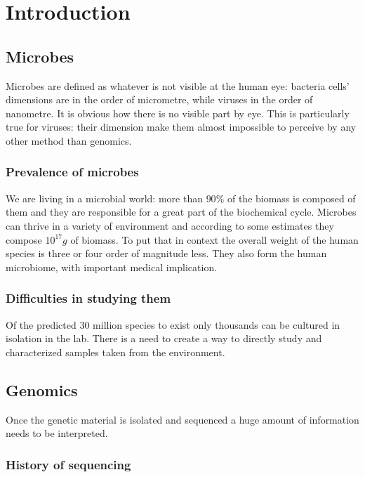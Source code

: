 \chapter{Introduction}

\section{Microbes}
Microbes are defined as whatever is not visible at the human eye: bacteria cells' dimensions are in the order of micrometre, while viruses in the order of nanometre.
It is obvious how there is no visible part by eye.
This is particularly true for viruses: their dimension make them almost impossible to perceive by any other method than genomics.

	\subsection{Prevalence of microbes}
	We are living in a microbial world: more than $90\%$ of the biomass is composed of them and they are responsible for a great part of the biochemical cycle.
	Microbes can thrive in a variety of environment and according to some estimates they compose $10^{17}g$ of biomass.
	To put that in context the overall weight of the human species is three or four order of magnitude less.
	They also form the human microbiome, with important medical implication.

	\subsection{Difficulties in studying them}
	Of the predicted $30$ million species to exist only thousands can be cultured in isolation in the lab.
	There is a need to create a way to directly study and characterized samples taken from the environment.

\section{Genomics}
Once the genetic material is isolated and sequenced a huge amount of information needs to be interpreted.

	\subsection{History of sequencing}

